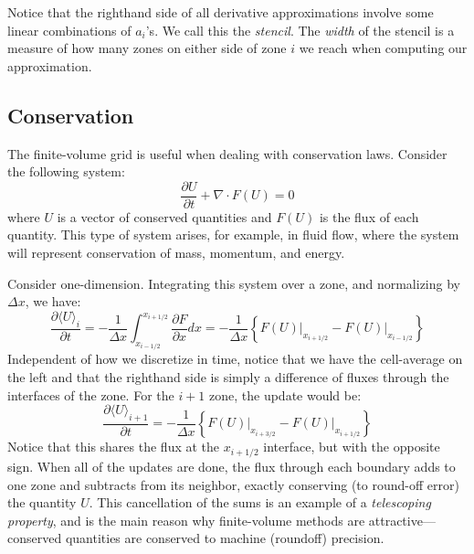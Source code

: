 Notice that the righthand side of all derivative approximations involve
some linear combinations of $a_i$'s.  We call this the {\em stencil}.
The {\em width} of the stencil is a measure of how many zones on
either side of zone $i$ we reach when computing our approximation.

\subsection{Conservation}

The finite-volume grid is useful when dealing with conservation laws.
Consider the following system:
\begin{equation}
\frac{\partial U}{\partial t} + \nabla \cdot F(U) = 0
\end{equation}
where $U$ is a vector of conserved quantities and $F(U)$ is the flux
of each quantity.  This type of system arises, for example, in fluid
flow, where the system will represent conservation of mass, momentum,
and energy.

Consider one-dimension.  
Integrating this system over a zone, and normalizing by $\Delta x$, we have:
\begin{equation}
\frac{\partial \langle U\rangle_i}{\partial t} = 
  -\frac{1}{\Delta x} \int_{x_{i-1/2}}^{x_{i+1/2}} \frac{\partial F}{\partial x} dx =
  - \frac{1}{\Delta x} \left \{ \left . F(U) \right |_{x_{i+1/2}} -
                                \left . F(U) \right |_{x_{i-1/2}} \right \}
\end{equation}
Independent of how we discretize in time, notice that we have the cell-average
on the left and that the righthand side
is simply a difference of fluxes through the interfaces of the zone.
For the $i+1$ zone, the update would be:
\begin{equation}
\label{eq:consup}
\frac{\partial \langle U\rangle_{i+1}}{\partial t} = 
  - \frac{1}{\Delta x} \left \{ \left . F(U) \right |_{x_{i+3/2}} -
                                \left . F(U) \right |_{x_{i+1/2}} \right \}
\end{equation}
Notice that this shares the flux at the $x_{i+1/2}$ interface, but with the 
opposite sign.  When all of the updates are done, the flux through each
boundary adds to one zone and subtracts from its neighbor, exactly conserving
(to round-off error) the quantity $U$.  This cancellation of the sums
is an example of a {\em telescoping property}, and is the main reason
why finite-volume methods are attractive---conserved quantities are 
conserved to machine (roundoff) precision.

